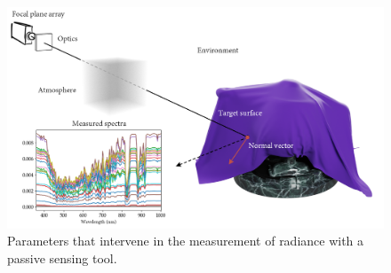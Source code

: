 \begin{figure}[ht]
	\includegraphics[width=.9\textwidth]{figs/fundamentals/physic_principles.png}
	\caption{Parameters that intervene in the measurement of radiance with a passive sensing tool. }
    \label{fig:physic_principles}
\end{figure}

